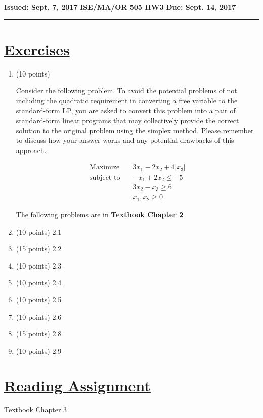 \documentclass[12pt]{article}
\begin{document}
 
 

\textbf{Issued: Sept. 7, 2017 } \qquad 
\textbf{ISE/MA/OR 505 HW3} \qquad 
\textbf{Due: Sept. 14, 2017}
\vspace{3mm}
\hrule


\section*{\underline{Exercises}}

\begin{enumerate}
\item  
(10 points)

Consider the following problem. To avoid the potential problems of not including the quadratic requirement in converting a free variable to the standard-form LP, you are asked to convert this problem into a pair of standard-form linear programs that may collectively provide the correct solution to the original problem using the simplex method. Please remember to discuss how your answer works and any potential drawbacks of this approach. 

\begin{equation*}
\begin{aligned}
\text{Maximize} \quad & 3x_1 -2x_2 + 4|x_3| \\
\text{subject\  to} \quad & -x_1 + 2x_2 \leqslant -5 \\
& 3x_2 - x_3 \geqslant 6 \\
& x_1, x_2 \geqslant 0
\end{aligned}
\end{equation*}


\vspace{5mm}

The following problems are in \textbf{Textbook Chapter 2}

\item (10 points) 2.1
\item (15 points) 2.2
\item (10 points) 2.3
\item (10 points) 2.4
\item (10 points) 2.5
\item (10 points) 2.6
\item (15 points) 2.8
\item (10 points) 2.9

\end{enumerate}

\section*{\underline{Reading Assignment}}

Textbook Chapter 3
\end{document}
